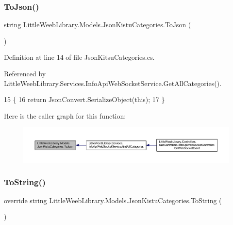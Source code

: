 \subsubsection{\texorpdfstring{To\+Json()}{ToJson()}}
{\footnotesize\ttfamily string Little\+Weeb\+Library.\+Models.\+Json\+Kistu\+Categories.\+To\+Json (\begin{DoxyParamCaption}{ }\end{DoxyParamCaption})}



Definition at line 14 of file Json\+Kitsu\+Categories.\+cs.



Referenced by Little\+Weeb\+Library.\+Services.\+Info\+Api\+Web\+Socket\+Service.\+Get\+All\+Categories().


\begin{DoxyCode}
15         \{
16             \textcolor{keywordflow}{return} JsonConvert.SerializeObject(\textcolor{keyword}{this});
17         \}
\end{DoxyCode}
Here is the caller graph for this function\+:\nopagebreak
\begin{figure}[H]
\begin{center}
\leavevmode
\includegraphics[width=350pt]{class_little_weeb_library_1_1_models_1_1_json_kistu_categories_aaab94c1dc228770f7bf0b66f4a47fd54_icgraph}
\end{center}
\end{figure}
\mbox{\label{class_little_weeb_library_1_1_models_1_1_json_kistu_categories_af972fa0332070ba294c5117b95836aa4}} 
\subsubsection{\texorpdfstring{To\+String()}{ToString()}}
{\footnotesize\ttfamily override string Little\+Weeb\+Library.\+Models.\+Json\+Kistu\+Categories.\+To\+String (\begin{DoxyParamCaption}{ }\end{DoxyParamCaption})}



